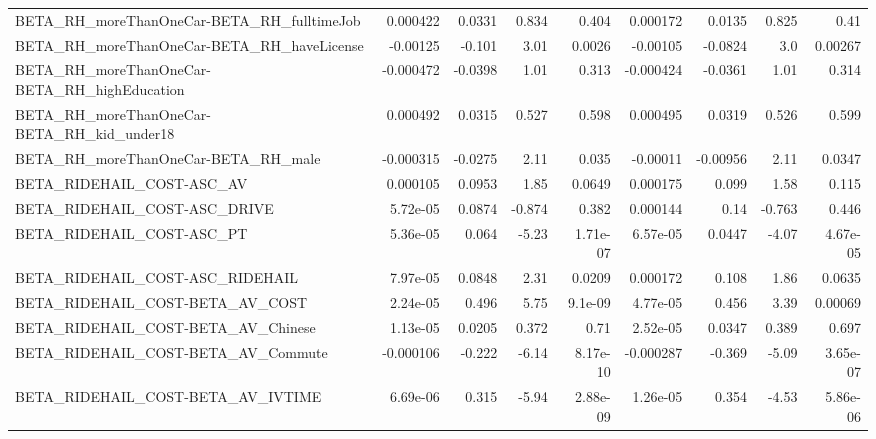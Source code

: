 \begin{tabular}{lrrrrrrrr}
BETA\_RH\_moreThanOneCar-BETA\_RH\_fulltimeJob         &    0.000422 &       0.0331 &    0.834 &    0.404 &   0.000172 &      0.0135 &        0.825 &          0.41 \\
BETA\_RH\_moreThanOneCar-BETA\_RH\_haveLicense         &    -0.00125 &       -0.101 &     3.01 &   0.0026 &   -0.00105 &     -0.0824 &          3.0 &       0.00267 \\
BETA\_RH\_moreThanOneCar-BETA\_RH\_highEducation       &   -0.000472 &      -0.0398 &     1.01 &    0.313 &  -0.000424 &     -0.0361 &         1.01 &         0.314 \\
BETA\_RH\_moreThanOneCar-BETA\_RH\_kid\_under18         &    0.000492 &       0.0315 &    0.527 &    0.598 &   0.000495 &      0.0319 &        0.526 &         0.599 \\
BETA\_RH\_moreThanOneCar-BETA\_RH\_male                &   -0.000315 &      -0.0275 &     2.11 &    0.035 &   -0.00011 &    -0.00956 &         2.11 &        0.0347 \\
BETA\_RIDEHAIL\_COST-ASC\_AV                          &    0.000105 &       0.0953 &     1.85 &   0.0649 &   0.000175 &       0.099 &         1.58 &         0.115 \\
BETA\_RIDEHAIL\_COST-ASC\_DRIVE                       &    5.72e-05 &       0.0874 &   -0.874 &    0.382 &   0.000144 &        0.14 &       -0.763 &         0.446 \\
BETA\_RIDEHAIL\_COST-ASC\_PT                          &    5.36e-05 &        0.064 &    -5.23 & 1.71e-07 &   6.57e-05 &      0.0447 &        -4.07 &      4.67e-05 \\
BETA\_RIDEHAIL\_COST-ASC\_RIDEHAIL                    &    7.97e-05 &       0.0848 &     2.31 &   0.0209 &   0.000172 &       0.108 &         1.86 &        0.0635 \\
BETA\_RIDEHAIL\_COST-BETA\_AV\_COST                    &    2.24e-05 &        0.496 &     5.75 &  9.1e-09 &   4.77e-05 &       0.456 &         3.39 &       0.00069 \\
BETA\_RIDEHAIL\_COST-BETA\_AV\_Chinese                 &    1.13e-05 &       0.0205 &    0.372 &     0.71 &   2.52e-05 &      0.0347 &        0.389 &         0.697 \\
BETA\_RIDEHAIL\_COST-BETA\_AV\_Commute                 &   -0.000106 &       -0.222 &    -6.14 & 8.17e-10 &  -0.000287 &      -0.369 &        -5.09 &      3.65e-07 \\
BETA\_RIDEHAIL\_COST-BETA\_AV\_IVTIME                  &    6.69e-06 &        0.315 &    -5.94 & 2.88e-09 &   1.26e-05 &       0.354 &        -4.53 &      5.86e-06 \\

\end{tabular}
